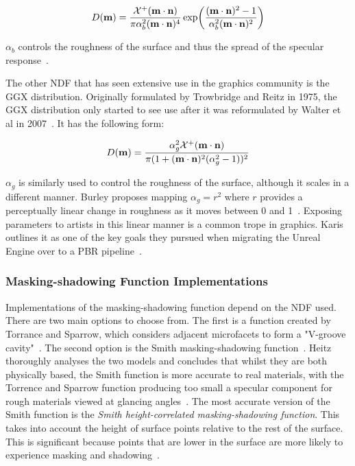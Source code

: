 \begin{equation}
	D(\mathbf{m}) = \frac{\mathcal{X}^+(\mathbf{m}\cdot\mathbf{n})}{\pi\alpha_b^2(\mathbf{m}\cdot\mathbf{n})^4}\exp(\frac{(\mathbf{m}\cdot\mathbf{n})^2 - 1}{\alpha_b^2(\mathbf{m}\cdot\mathbf{n})^2})
\end{equation}

\begin{math}\alpha_b\end{math} controls the roughness of the surface and thus the spread of the specular response~\cite{CookTorrance}.

The other NDF that has seen extensive use in the graphics community is the GGX distribution. Originally formulated by Trowbridge and Reitz in 1975, the GGX distribution only started to see use after it was reformulated by Walter et al in 2007~\cite{TrowbridgeAndReitz}\cite{WalterRefraction}. It has the following form:

\begin{equation}
	D(\mathbf{m}) = \frac{\alpha_g^2\mathcal{X}^+(\mathbf{m}\cdot\mathbf{n})}{\pi(1 + (\mathbf{m}\cdot\mathbf{n})^2(\alpha_g^2 - 1))^2}
\end{equation}

\begin{math}\alpha_g\end{math} is similarly used to control the roughness of the surface, although it scales in a different manner. Burley proposes mapping \begin{math}\alpha_g = r^2\end{math} where \begin{math}r\end{math} provides a perceptually linear change in roughness as it moves between 0 and 1~\cite{Burley2012Physically}. Exposing parameters to artists in this linear manner is a common trope in graphics. Karis outlines it as one of the key goals they pursued when migrating the Unreal Engine over to a PBR pipeline~\cite{RealShadingInUnreal}.

\subsubsection{Masking-shadowing Function Implementations}

Implementations of the masking-shadowing function depend on the NDF used. There are two main options to choose from. The first is a function created by Torrance and Sparrow, which considers adjacent microfacets to form a "V-groove cavity"~\cite{TorranceSparrowVCavity}. The second option is the Smith masking-shadowing function~\cite{SmithMaskingShadowingFunction}. Heitz thoroughly analyses the two models and concludes that whilst they are both physically based, the Smith function is more accurate to real materials, with the Torrence and Sparrow function producing too small a specular component for rough materials viewed at glancing angles~\cite{HeitzMicrofacetTheory}. The most accurate version of the Smith function is the \textit{Smith height-correlated masking-shadowing function}. This takes into account the height of surface points relative to the rest of the surface. This is significant because points that are lower in the surface are more likely to experience masking and shadowing~\cite{RTR4}.

